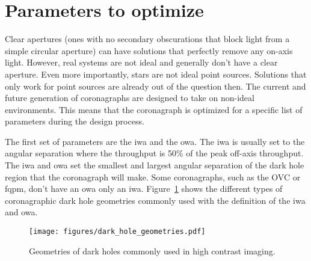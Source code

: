 \documentclass[letterpaper]{ar-1col}
\newcommand{\acc}[1]{\entry{\acs{#1}}{\acl{#1}}}
\begin{document}
\section{Parameters to optimize}


\begin{armarginnote}[]
\acc{iwa}
\acc{owa}
\end{armarginnote}

Clear apertures (ones with no secondary obscurations that block light from a simple circular aperture) can have solutions that perfectly remove any on-axis light.
%
However, real systems are not ideal and generally don't have a clear aperture.
%
Even more importantly, stars are not ideal point sources.
%
Solutions that only work for point sources are already out of the question then.
%
The current and future generation of coronagraphs are designed to take on non-ideal environments.
%
This means that the coronagraph is optimized for a specific list of parameters during the design process.

The first set of parameters are the \ac{iwa} and the \ac{owa}.
%
The \ac{iwa} is usually set to the angular separation where the throughput is 50\% of the peak off-axis throughput.
%
The \ac{iwa} and \ac{owa} set the smallest and largest angular separation of the dark hole region that the coronagraph will make.
%
Some coronagraphs, such as the OVC or \ac{fqpm}, don't have an \ac{owa} only an \ac{iwa}.
%
Figure~\ref{fig:coronagraph_focal_plane_definitions} shows the different types of coronagraphic dark hole geometries commonly used with the definition of the \ac{iwa} and \ac{owa}.

\begin{figure}[ht]
  \centering
  \texttt{[image: figures/dark\_hole\_geometries.pdf]}
  \caption{Geometries of dark holes commonly used in high contrast imaging.}
  \label{fig:coronagraph_focal_plane_definitions}
\end{figure}
\end{document}

